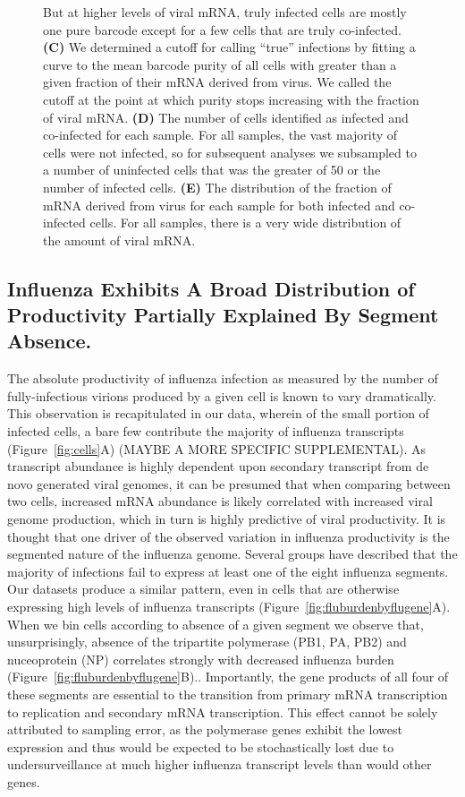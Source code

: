 \documentclass[9pt,lineno]{elife}
\begin{document}
\begin{figure}
{But at higher levels of viral mRNA, truly infected cells are mostly one pure barcode except for a few cells that are truly co-infected.
{\bf (C)}
We determined a cutoff for calling ``true'' infections by fitting a curve to the mean barcode purity of all cells with greater than a given fraction of their mRNA derived from virus.
We called the cutoff at the point at which purity stops increasing with the fraction of viral mRNA.
{\bf (D)}
The number of cells identified as infected and co-infected for each sample.
For all samples, the vast majority of cells were not infected, so for subsequent analyses we subsampled to a number of uninfected cells that was the greater of 50 or the number of infected cells.
{\bf (E)} 
The distribution of the fraction of mRNA derived from virus for each sample for both infected and co-infected cells.
For all samples, there is a very wide distribution of the amount of viral mRNA.
}
\label{fig:fracflu}
\end{figure}

\subsection{Influenza Exhibits A Broad Distribution of Productivity Partially Explained By Segment Absence.}
The absolute productivity of influenza infection as measured by the number of fully-infectious virions produced by a given cell is known to vary dramatically.  This observation is recapitulated in our data, wherein of the small portion of infected cells, a bare few contribute the majority of influenza transcripts (Figure~\ref{fig:cells}A) (MAYBE A MORE SPECIFIC SUPPLEMENTAL). As transcript abundance is highly dependent upon secondary transcript from de novo generated viral genomes, it can be presumed that when comparing between two cells, increased mRNA abundance is likely correlated with increased viral genome production, which in turn is highly predictive of viral productivity. It is thought that one driver of the observed variation in influenza productivity is the segmented nature of the influenza genome. Several groups have described that the majority of infections fail to express at least one of the eight influenza segments. Our datasets produce a similar pattern, even in cells that are otherwise expressing high levels of influenza transcripts (Figure~\ref{fig:fluburdenbyflugene}A). When we bin cells according to absence of a given segment we observe that, unsurprisingly, absence of the tripartite polymerase (PB1, PA, PB2) and nuceoprotein (NP) correlates strongly with decreased influenza burden (Figure~\ref{fig:fluburdenbyflugene}B).. Importantly, the gene products of all four of these segments are essential to the transition from primary mRNA transcription to replication and secondary mRNA transcription. This effect cannot be solely attributed to sampling error, as the polymerase genes exhibit the lowest expression and thus would be expected to be stochastically lost due to undersurveillance at much higher influenza transcript levels than would other genes. 
\end{document}
